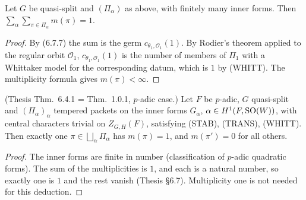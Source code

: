 \begin{theorem}
\label{sum_mult_eq_one}
\leanok
{}
Let $G$ be quasi-split and $(\Pi_\alpha)$ as above, with finitely many inner forms. Then
$\sum_\alpha\sum_{\pi\in\Pi_\alpha} m(\pi)=1$.
\end{theorem}
\begin{proof}
\leanok
{}
By (6.7.7) the sum is the germ $c_{\theta_1,\mathcal O_1}(1)$. By Rodier's theorem applied to
the regular orbit $\mathcal O_1$, $c_{\theta_1,\mathcal O_1}(1)$ is the number of members of $\Pi_1$ with a Whittaker
model for the corresponding datum, which is $1$ by (WHITT). The multiplicity formula gives $m(\pi)<\infty$.
\end{proof}

\begin{theorem}
\label{local_ggp_of_isUltrametricDist}
\leanok
{}
(Thesis Thm.~6.4.1 = Thm.~1.0.1, $p$-adic case.) Let $F$ be $p$-adic, $G$ quasi-split and
$(\Pi_\alpha)_\alpha$ tempered packets on the inner forms $G_\alpha$, $\alpha\in H^1(F,\mathrm{SO}(W))$, with central
characters trivial on $Z_{G,H}(F)$, satisfying (STAB), (TRANS), (WHITT). Then exactly one
$\pi\in\bigsqcup_\alpha\Pi_\alpha$ has $m(\pi)=1$, and $m(\pi')=0$ for all others.
\end{theorem}
\begin{proof}
\leanok
{}
The inner forms are finite in number (classification of $p$-adic quadratic forms). The sum of the
multiplicities is $1$, and each is a natural number, so exactly one is $1$ and the rest vanish
(Thesis \S6.7). Multiplicity one is not needed for this deduction.
\end{proof}


